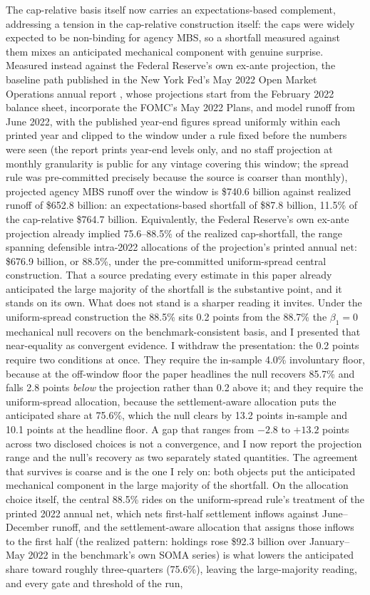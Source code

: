 \documentclass[12pt]{article}
\begin{document}
The cap-relative basis itself now carries an expectations-based complement, addressing a tension in the cap-relative construction itself: the caps were widely expected to be non-binding for agency MBS, so a shortfall measured against them mixes an anticipated mechanical component with genuine surprise. Measured instead against the Federal Reserve's own ex-ante projection, the baseline path published in the New York Fed's May 2022 Open Market Operations annual report \citep{omo2021}, whose projections start from the February 2022 balance sheet, incorporate the FOMC's May 2022 Plans, and model runoff from June 2022, with the published year-end figures spread uniformly within each printed year and clipped to the window under a rule fixed before the numbers were seen (the report prints year-end levels only, and no staff projection at monthly granularity is public for any vintage covering this window; the spread rule was pre-committed precisely because the source is coarser than monthly), projected agency MBS runoff over the window is \$740.6 billion against realized runoff of \$652.8 billion: an expectations-based shortfall of \$87.8 billion, 11.5\% of the cap-relative \$764.7 billion. Equivalently, the Federal Reserve's own ex-ante projection already implied 75.6--88.5\% of the realized cap-shortfall, the range spanning defensible intra-2022 allocations of the projection's printed annual net: \$676.9 billion, or 88.5\%, under the pre-committed uniform-spread central construction. That a source predating every estimate in this paper already anticipated the large majority of the shortfall is the substantive point, and it stands on its own. What does not stand is a sharper reading it invites. Under the uniform-spread construction the 88.5\% sits 0.2 points from the 88.7\% the $\beta_1 = 0$ mechanical null recovers on the benchmark-consistent basis, and I presented that near-equality as convergent evidence. I withdraw the presentation: the 0.2 points require two conditions at once. They require the in-sample 4.0\% involuntary floor, because at the off-window floor the paper headlines the null recovers 85.7\% and falls 2.8 points \emph{below} the projection rather than 0.2 above it; and they require the uniform-spread allocation, because the settlement-aware allocation puts the anticipated share at 75.6\%, which the null clears by 13.2 points in-sample and 10.1 points at the headline floor. A gap that ranges from $-2.8$ to $+13.2$ points across two disclosed choices is not a convergence, and I now report the projection range and the null's recovery as two separately stated quantities. The agreement that survives is coarse and is the one I rely on: both objects put the anticipated mechanical component in the large majority of the shortfall. On the allocation choice itself, the central 88.5\% rides on the uniform-spread rule's treatment of the printed 2022 annual net, which nets first-half settlement inflows against June--December runoff, and the settlement-aware allocation that assigns those inflows to the first half (the realized pattern: holdings rose \$92.3 billion over January--May 2022 in the benchmark's own SOMA series) is what lowers the anticipated share toward roughly three-quarters (75.6\%), leaving the large-majority reading, and every gate and threshold of the run, 
\end{document}

